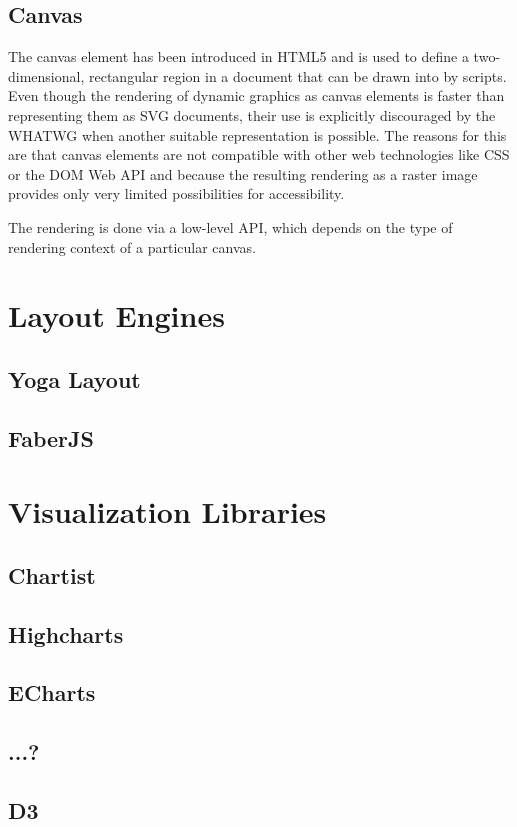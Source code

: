 \subsection{Canvas}

The canvas element has been introduced in HTML5 and is used to define a two-dimensional, rectangular region in a document that can be drawn into by scripts. Even though the rendering of dynamic graphics as canvas elements is faster than representing them as SVG documents, their use is explicitly discouraged by the WHATWG when another suitable representation is possible. The reasons for this are that canvas elements are not compatible with other web technologies like CSS or the DOM Web API and because the resulting rendering as a raster image provides only very limited possibilities for accessibility.

The rendering is done via a low-level API, which depends on the type of rendering context of a particular canvas.

\section{Layout Engines}

\subsection{Yoga Layout}
\subsection{FaberJS}

\section{Visualization Libraries}

\subsection{Chartist}
\subsection{Highcharts}
\subsection{ECharts}
\subsection{...?}
\subsection{D3}


